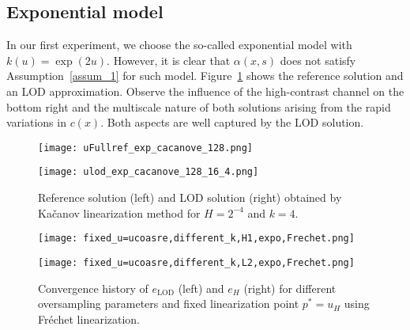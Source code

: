 \documentclass{article}
\begin{document}
   \subsection{Exponential model}
    In our first experiment, we choose the so-called exponential model with $k(u)= \exp(2u)$. However, it is clear that $\alpha(x,s)$ does not satisfy Assumption~\ref{assum_1} for such model. Figure~\ref{ref_lod_solution_expo} shows the reference solution and an LOD approximation. Observe the influence of the high-contrast channel on the bottom right and the multiscale nature of both solutions arising from the rapid variations in $c(x)$. Both aspects are well captured by the LOD solution.
\begin{figure} [h]
    \centering
    \begin{minipage}{0.43\textwidth}
       \centering      \texttt{[image: uFullref\_exp\_cacanove\_128.png]} 
    
       
    \end{minipage}
    \hfill
    \begin{minipage}{0.43\textwidth}
         \centering  
    \texttt{[image: ulod\_exp\_cacanove\_128\_16\_4.png]} 
     
    
    \end{minipage}
    \caption{Reference solution (left) and LOD solution (right) obtained by Kačanov linearization method for $H=2^{-4}$ and $k=4$.}\label{ref_lod_solution_expo}  
\end{figure}

\begin{figure}[ht]
    \centering
    \begin{minipage}{0.49\textwidth}
         \centering  
    \texttt{[image: fixed\_u=ucoasre,different\_k,H1,expo,Frechet.png]}      \end{minipage}
    \hfill
    \begin{minipage}{0.49\textwidth}
       \centering  
    \texttt{[image: fixed\_u=ucoasre,different\_k,L2,expo,Frechet.png]} 
 
     
    \end{minipage}
     
    \caption{Convergence history of $e_{\operatorname{LOD}}$ (left) and $e_H$ (right) for different oversampling parameters and fixed linearization point $p^{*}=u_H$ using Fréchet linearization.}\label{polp1}
\end{figure}
\end{document}
